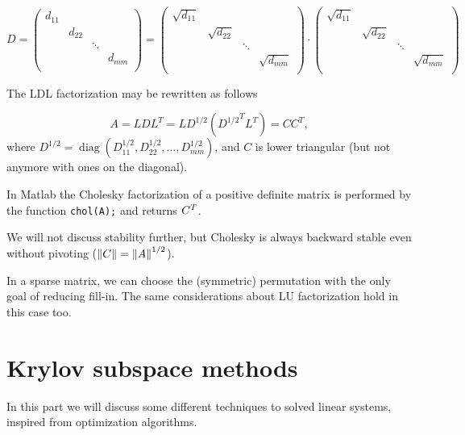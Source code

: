 \documentclass[computationalMathematics.tex]{subfiles}
\begin{document}
$D = \begin{pmatrix}
  d_{11}&&\\
  &d_{22} &\\
  && \ddots\\
  &&& d_{mm}\\
\end{pmatrix} = \begin{pmatrix}
  \sqrt{d_{11}}&&\\
  &\sqrt{d_{22}} &\\
  && \ddots\\
  &&& \sqrt{d_{mm}}\\
\end{pmatrix} \cdot
\begin{pmatrix}
  \sqrt{d_{11}}&&\\
  &\sqrt{d_{22}} &\\
  && \ddots\\
  &&& \sqrt{d_{mm}}\\
\end{pmatrix}
$

The LDL factorization may be rewritten as follows

\[
A = LDL^T = LD^{1/2} ({D^{1/2}}^T L^T) = C C^T,
\]
where $D^{1/2} = \operatorname{diag}(D_{11}^{1/2}, D_{22}^{1/2},\dots,D_{mm}^{1/2})$, and $C$ is lower triangular (but not anymore with ones on the diagonal).

In Matlab the Cholesky factorization of a positive definite matrix is performed by the function \texttt{chol(A);} and returns ${C}^{T}$.

\begin{obs}
We will not discuss stability further, but Cholesky is always backward stable even without pivoting ($\left\lVert C\right\rVert=\left\lVert A\right\rVert^{1/2}$).
\end{obs}


\begin{obs}
In a sparse matrix, we can choose the (symmetric) permutation with the only goal of reducing fill-in. The same considerations about LU factorization hold in this case too.
\end{obs}

\section{Krylov subspace methods}

In this part we will discuss some different techniques to solved linear systems, inspired from optimization algorithms.
\end{document}
